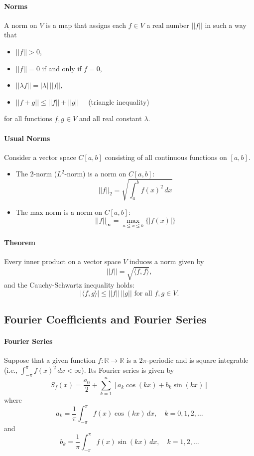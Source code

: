 \paragraph{Norms}
A norm on \(V\) is a map that assigns each \(f \in V\) a real number \(||f||\) in such a way that 
\begin{itemize}
    \item \(||f|| > 0\),
    \item \(||f|| = 0\) if and only if \(f = 0\),
    \item \(||\lambda f|| = |\lambda| \, ||f||\),
    \item \(||f + g|| \leq ||f|| + ||g|| \quad\) (triangle inequality)
\end{itemize}
for all functions \(f, g \in V\) and all real constant \(\lambda\).

\paragraph{Usual Norms}
Consider a vector space \(C[a,b]\) consisting of all continuous functions on \([a,b]\).
\begin{itemize}
    \item The 2-norm (\(L^2\)-norm) is a norm on \(C[a, b]\):
    \[||f||_2 = \sqrt{\int_a^b f(x)^2 \, dx}\]
    \item The max norm is a norm on \(C[a, b]\):
    \[||f||_\infty = \max_{a \leq x \leq b} \{|f(x)|\}\]
\end{itemize}

\paragraph{Theorem}
Every inner product on a vector space \(V\) induces a norm given by 
\[||f|| = \sqrt{\langle f, f\rangle},\]
and the Cauchy-Schwartz inequality holds:
\[|\langle f, g \rangle| \leq ||f|| \, ||g|| \text{ for all } f,g \in V.\]

\subsection{Fourier Coefficients and Fourier Series}
\paragraph{Fourier Series} 
Suppose that a given function \(f: \mathbb R \to \mathbb R\) is a \(2\pi\)-periodic and is square integrable (i.e., \(\int_{-\pi}^\pi f(x)^2 \, dx < \infty\)). Its Fourier series is given by 
\[S_f(x) = \frac{a_0}{2}+\sum_{k=1}^n [a_k\cos(kx) + b_k\sin(kx)]\]
where 
\[a_k = \frac{1}{\pi} \int_{-\pi}^\pi f(x)\cos(kx) \, dx, \quad k = 0, 1,2,\dots\]
and 
\[b_k = \frac{1}{\pi} \int_{-\pi}^\pi f(x)\sin(kx) \, dx, \quad k = 1,2,\dots\]

